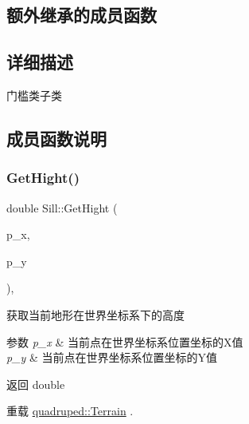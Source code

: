 \subsection*{额外继承的成员函数}


\subsection{详细描述}
门槛类子类 

\subsection{成员函数说明}
\mbox{\label{classquadruped_1_1Sill_ab128372a0914aef0c2665e71a059a615}} 
\subsubsection{\texorpdfstring{Get\+Hight()}{GetHight()}}
{\footnotesize\ttfamily double Sill\+::\+Get\+Hight (\begin{DoxyParamCaption}\item[{double}]{p\+\_\+x,  }\item[{double}]{p\+\_\+y }\end{DoxyParamCaption})\hspace{0.3cm}{\ttfamily [override]}, {\ttfamily [virtual]}}



获取当前地形在世界坐标系下的高度 


\begin{DoxyParams}{参数}
{\em p\+\_\+x} & 当前点在世界坐标系位置坐标的\+X值 \\
\hline
{\em p\+\_\+y} & 当前点在世界坐标系位置坐标的\+Y值 \\
\hline
\end{DoxyParams}
\begin{DoxyReturn}{返回}
double 
\end{DoxyReturn}


重载 \hyperlink{classquadruped_1_1Terrain}{quadruped\+::\+Terrain} .

\mbox{\label{classquadruped_1_1Sill_a27ad935cad8d7be75991a287c2de5283}} 
